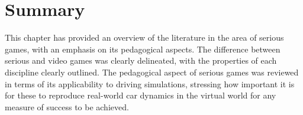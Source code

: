 \section{Summary}
This chapter has provided an overview of the literature in the area of serious games, with an emphasis on its pedagogical aspects. The difference between serious and video games was clearly delineated, with the properties of each discipline clearly outlined. The pedagogical aspect of serious games was reviewed in terms of its applicability to driving simulations, stressing how important it is for these to reproduce real-world car dynamics in the virtual world for any measure of success to be achieved.